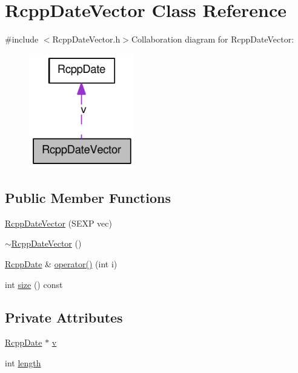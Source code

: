 \hypertarget{classRcppDateVector}{
\section{RcppDateVector Class Reference}
\label{classRcppDateVector}
}


{\ttfamily \#include $<$RcppDateVector.h$>$}Collaboration diagram for RcppDateVector:\nopagebreak
\begin{figure}[H]
\begin{center}
\leavevmode
\includegraphics[width=130pt]{classRcppDateVector__coll__graph}
\end{center}
\end{figure}
\subsection*{Public Member Functions}
\begin{DoxyCompactItemize}
\item 
\hyperlink{classRcppDateVector_a65de4c0807f5c4b33429c8ebb5224831}{RcppDateVector} (SEXP vec)
\item 
\hyperlink{classRcppDateVector_aad0851f7555a09615ccb17bcb20fc7f1}{$\sim$RcppDateVector} ()
\item 
\hyperlink{classRcppDate}{RcppDate} \& \hyperlink{classRcppDateVector_a42dad3d60fb136604f019353671195fe}{operator()} (int i)
\item 
int \hyperlink{classRcppDateVector_ac308c17e5e79ceb69600e306a7983a9a}{size} () const 
\end{DoxyCompactItemize}
\subsection*{Private Attributes}
\begin{DoxyCompactItemize}
\item 
\hyperlink{classRcppDate}{RcppDate} $\ast$ \hyperlink{classRcppDateVector_afaa34ebaf3d8bac309e81895c376f545}{v}
\item 
int \hyperlink{classRcppDateVector_aa36764f68111a84b737b78600ff06433}{length}
\end{DoxyCompactItemize}


